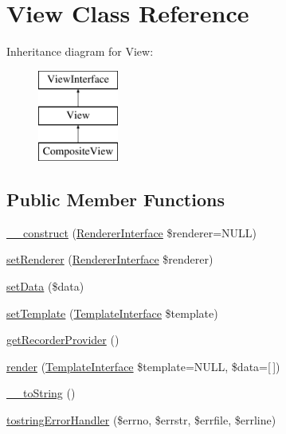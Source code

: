 \hypertarget{class_pes_1_1_view_1_1_view}{}\section{View Class Reference}
\label{class_pes_1_1_view_1_1_view}
Inheritance diagram for View\+:\begin{figure}[H]
\begin{center}
\leavevmode
\includegraphics[height=3.000000cm]{class_pes_1_1_view_1_1_view}
\end{center}
\end{figure}
\subsection*{Public Member Functions}
\begin{DoxyCompactItemize}
\item 
\mbox{\hyperlink{class_pes_1_1_view_1_1_view_af62e04a1fa847074a86af330864028d3}{\+\_\+\+\_\+construct}} (\mbox{\hyperlink{interface_pes_1_1_view_1_1_renderer_1_1_renderer_interface}{Renderer\+Interface}} \$renderer=N\+U\+LL)
\item 
\mbox{\hyperlink{class_pes_1_1_view_1_1_view_a2858c054f485d8b15887f6cbbdc4087b}{set\+Renderer}} (\mbox{\hyperlink{interface_pes_1_1_view_1_1_renderer_1_1_renderer_interface}{Renderer\+Interface}} \$renderer)
\item 
\mbox{\hyperlink{class_pes_1_1_view_1_1_view_a5ae172026b770b4c669fe7478120591c}{set\+Data}} (\$data)
\item 
\mbox{\hyperlink{class_pes_1_1_view_1_1_view_aa36ace36242d7477b0f7ad44a05bd292}{set\+Template}} (\mbox{\hyperlink{interface_pes_1_1_view_1_1_template_1_1_template_interface}{Template\+Interface}} \$template)
\item 
\mbox{\hyperlink{class_pes_1_1_view_1_1_view_a8e0a6cf7028aff1ada59a30dab75adf0}{get\+Recorder\+Provider}} ()
\item 
\mbox{\hyperlink{class_pes_1_1_view_1_1_view_a62b5a3861ff3b1f8a28911db4c11ae47}{render}} (\mbox{\hyperlink{interface_pes_1_1_view_1_1_template_1_1_template_interface}{Template\+Interface}} \$template=N\+U\+LL, \$data=\mbox{[}$\,$\mbox{]})
\item 
\mbox{\hyperlink{class_pes_1_1_view_1_1_view_a7516ca30af0db3cdbf9a7739b48ce91d}{\+\_\+\+\_\+to\+String}} ()
\item 
\mbox{\hyperlink{class_pes_1_1_view_1_1_view_a67d7912a0c897b0b6530b0bd3a849024}{tostring\+Error\+Handler}} (\$errno, \$errstr, \$errfile, \$errline)
\end{DoxyCompactItemize}
